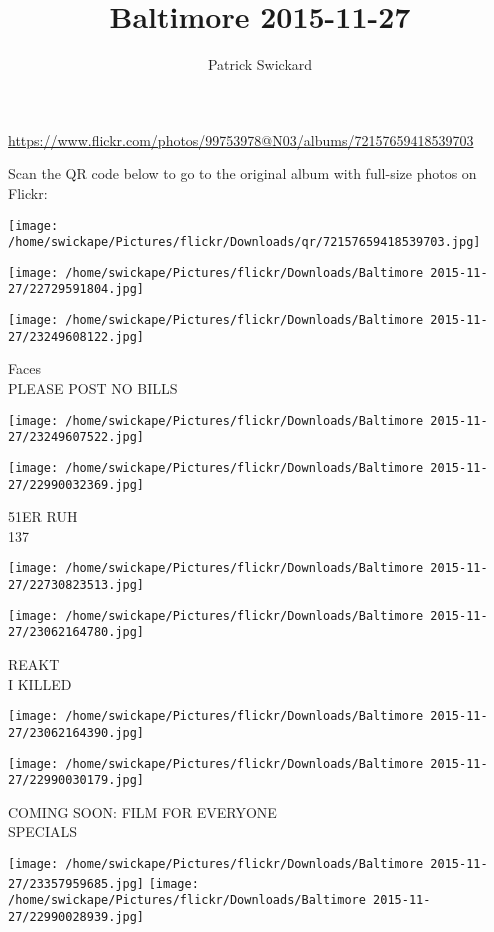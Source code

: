 \documentclass[10pt,letterpaper]{article}
\title{Baltimore 2015-11-27}
\author{Patrick Swickard}
\date{}
\begin{document}
\maketitle

\url{https://www.flickr.com/photos/99753978@N03/albums/72157659418539703}

Scan the QR code below to go to the original album with full-size photos on Flickr:

\texttt{[image: /home/swickape/Pictures/flickr/Downloads/qr/72157659418539703.jpg]}
\pagebreak

\texttt{[image: /home/swickape/Pictures/flickr/Downloads/Baltimore 2015-11-27/22729591804.jpg]}

\vspace{0.25in}
\texttt{[image: /home/swickape/Pictures/flickr/Downloads/Baltimore 2015-11-27/23249608122.jpg]}

Faces\\
PLEASE POST NO BILLS
\pagebreak

\texttt{[image: /home/swickape/Pictures/flickr/Downloads/Baltimore 2015-11-27/23249607522.jpg]}

\vspace{0.25in}
\texttt{[image: /home/swickape/Pictures/flickr/Downloads/Baltimore 2015-11-27/22990032369.jpg]}

51ER RUH\\
137
\pagebreak

\texttt{[image: /home/swickape/Pictures/flickr/Downloads/Baltimore 2015-11-27/22730823513.jpg]}

\vspace{0.25in}
\texttt{[image: /home/swickape/Pictures/flickr/Downloads/Baltimore 2015-11-27/23062164780.jpg]}

REAKT\\
I KILLED
\pagebreak

\texttt{[image: /home/swickape/Pictures/flickr/Downloads/Baltimore 2015-11-27/23062164390.jpg]}

\vspace{0.25in}
\texttt{[image: /home/swickape/Pictures/flickr/Downloads/Baltimore 2015-11-27/22990030179.jpg]}

COMING SOON: FILM FOR EVERYONE\\
SPECIALS
\pagebreak

\texttt{[image: /home/swickape/Pictures/flickr/Downloads/Baltimore 2015-11-27/23357959685.jpg]}
\texttt{[image: /home/swickape/Pictures/flickr/Downloads/Baltimore 2015-11-27/22990028939.jpg]}
\end{document}
